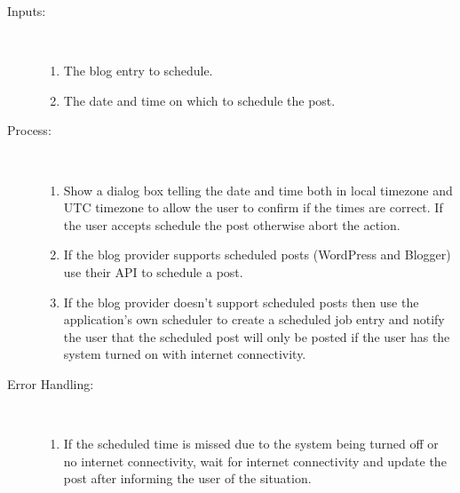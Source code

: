 \begin{description}
    \item [Inputs:] ~
    \begin{enumerate}[noitemsep]
        \item {The blog entry to schedule.}
        \item {The date and time on which to schedule the post.}
    \end{enumerate}
    \item [Process:] ~
    \begin{enumerate}[noitemsep]
        \item {Show a dialog box telling the date and time both in local timezone and UTC timezone to allow the user to
               confirm if the times are correct. If the user accepts schedule the post otherwise abort the action.}
        \item {If the blog provider supports scheduled posts (WordPress and Blogger) use their API to schedule a post.}
        \item {If the blog provider doesn't support scheduled posts then use the application's own scheduler to create a
               scheduled job entry and notify the user that the scheduled post will only be posted if the user has the
               system turned on with internet connectivity.}
    \end{enumerate}
    \item [Error Handling:] ~
    \begin{enumerate}[noitemsep]
        \item {If the scheduled time is missed due to the system being turned off or no internet connectivity, wait for
               internet connectivity and update the post after informing the user of the situation.}
    \end{enumerate}
\end{description}
